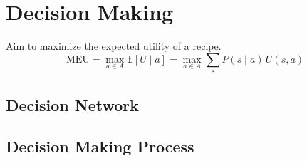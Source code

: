 \section{Decision Making}
Aim to maximize the expected utility of a recipe.
$$
\text{MEU} = \max_{a \in A} \mathbb{E}[U \mid a] = \max_{a \in A} \sum_s P(s \mid a) \, U(s, a)
$$
\subsection{Decision Network}

\subsection{Decision Making Process}
